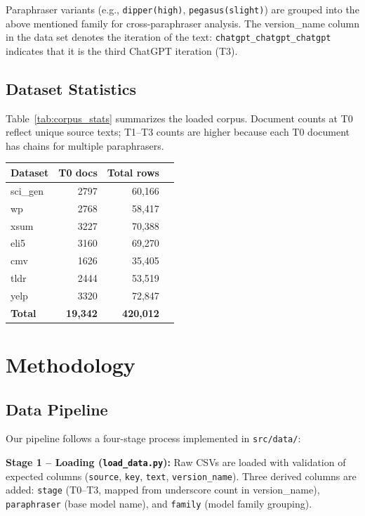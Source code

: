 \documentclass[10pt,twocolumn]{article}
\begin{document}
\noindent Paraphraser variants (e.g., \texttt{dipper(high)}, \texttt{pegasus(slight)}) are grouped into the above mentioned family for cross-paraphraser analysis. The version\_name column in the data set denotes the iteration of the text: \texttt{chatgpt\_chatgpt\_chatgpt} indicates that it is the third ChatGPT iteration (T3).

\subsection{Dataset Statistics}

Table~\ref{tab:corpus_stats} summarizes the loaded corpus. Document counts
at T0 reflect unique source texts; T1--T3 counts are higher because each
T0 document has chains for multiple paraphrasers.

\begin{center}
\small
\begin{tabular}{lrrr}
\toprule
\textbf{Dataset} & \textbf{T0 docs} & \textbf{Total rows} \\
\midrule
sci\_gen  & 2797  & 60,166 \\
wp        & 2768  & 58,417 \\
xsum      & 3227  & 70,388 \\
eli5      & 3160  & 69,270 \\
cmv       & 1626  & 35,405 \\
tldr      & 2444  & 53,519 \\
yelp      & 3320  & 72,847 \\
\midrule
\textbf{Total} & \textbf{19,342} & \textbf{420,012} \\
\bottomrule
\end{tabular}
\label{tab:corpus_stats}
\end{center}

\section{Methodology}

\subsection{Data Pipeline}
Our pipeline follows a four-stage process implemented in \texttt{src/data/}:

\textbf{Stage 1 -- Loading (\texttt{load\_data.py}):} Raw CSVs are loaded
with validation of expected columns (\texttt{source}, \texttt{key},
\texttt{text}, \texttt{version\_name}). Three derived columns are added:
\texttt{stage} (T0--T3, mapped from underscore count in version\_name),
\texttt{paraphraser} (base model name), and \texttt{family} (model family
grouping).
\end{document}
